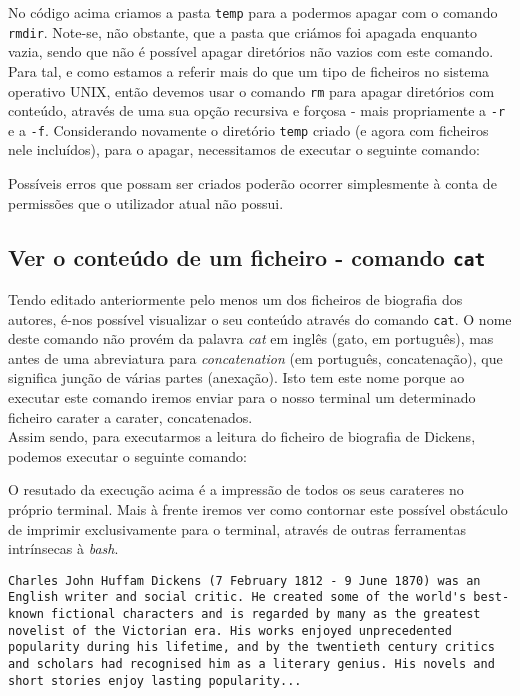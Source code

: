 \documentclass[a4paper, onecolumn, 10pt]{report}
\begin{document}


No código acima criamos a pasta \texttt{temp} para a podermos apagar com o comando \texttt{rmdir}. Note-se, não obstante, que a pasta que criámos foi apagada enquanto vazia, sendo que não é possível apagar diretórios não vazios com este comando. Para tal, e como estamos a referir mais do que um tipo de ficheiros no sistema operativo UNIX, então devemos usar o comando \texttt{rm} para apagar diretórios com conteúdo, através de uma sua opção recursiva e forçosa - mais propriamente a \texttt{-r} e a \texttt{-f}. Considerando novamente o diretório \texttt{temp} criado (e agora com ficheiros nele incluídos), para o apagar, necessitamos de executar o seguinte comando:



Possíveis erros que possam ser criados poderão ocorrer simplesmente à conta de permissões que o utilizador atual não possui.

\subsection{Ver o conteúdo de um ficheiro - comando \texttt{cat}}

Tendo editado anteriormente pelo menos um dos ficheiros de biografia dos autores, é-nos possível visualizar o seu conteúdo através do comando \texttt{cat}. O nome deste comando não provém da palavra \textit{cat} em inglês (gato, em português), mas antes de uma abreviatura para \textit{concatenation} (em português, concatenação), que significa junção de várias partes (anexação). Isto tem este nome porque ao executar este comando iremos enviar para o nosso terminal um determinado ficheiro carater a carater, concatenados. \\
Assim sendo, para executarmos a leitura do ficheiro de biografia de Dickens, podemos executar o seguinte comando:



O resutado da execução acima é a impressão de todos os seus carateres no próprio terminal. Mais à frente iremos ver como contornar este possível obstáculo de imprimir exclusivamente para o terminal, através de outras ferramentas intrínsecas à \textit{bash}. 

\begin{lstlisting}[style=console]
Charles John Huffam Dickens (7 February 1812 - 9 June 1870) was an English writer and social critic. He created some of the world's best-known fictional characters and is regarded by many as the greatest novelist of the Victorian era. His works enjoyed unprecedented popularity during his lifetime, and by the twentieth century critics and scholars had recognised him as a literary genius. His novels and short stories enjoy lasting popularity...
\end{lstlisting}
\end{document}
